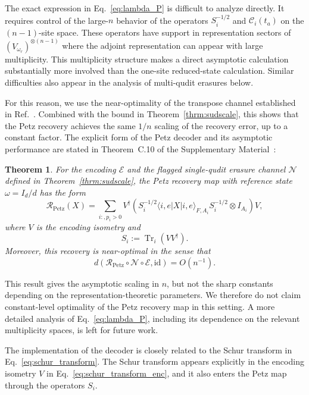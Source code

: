\documentclass[10pt,twocolumn,superscriptaddress,aps,amsmath,amssymb,citeautoscript,floatfix,prx]{revtex4-2}
\newtheorem{theorem}{Theorem}
\theoremstyle{plain}
\theoremstyle{plain}
\theoremstyle{plain}
\theoremstyle{plain}
\theoremstyle{plain}
\theoremstyle{plain}
\begin{document}
The exact expression in Eq.~\eqref{eq:lambda_P} is difficult to analyze directly. It requires control of the large-$n$ behavior of the operators $S_i^{-1/2}$ and $\mathcal C_i(t_a)$ on the $(n-1)$-site space. These operators have support in representation sectors of $(V_{\omega_r})^{\otimes(n-1)}$ where the adjoint representation can appear with large multiplicity. This multiplicity structure makes a direct asymptotic calculation substantially more involved than the one-site reduced-state calculation. Similar difficulties also appear in the analysis of multi-qudit erasures below.

For this reason, we use the near-optimality of the transpose channel established in Ref.~\cite{Ng2010}. Combined with the bound in Theorem~\ref{thrm:sudscale}, this shows that the Petz recovery achieves the same $1/n$ scaling of the recovery error, up to a constant factor. The explicit form of the Petz decoder and its asymptotic performance are stated in Theorem~C.10 of the Supplementary Material~\cite{SuppMat}:

\begin{theorem}
For the encoding $\mathcal E$ and the flagged single-qudit erasure channel $\mathcal N$ defined in Theorem~\ref{thrm:sudscale}, the Petz recovery map with reference state $\omega=I_d/d$ has the form
$$
\mathcal R_{\mathrm{Petz}}(X)
=
\sum_{i:,p_i>0}
V^\dagger
\left(
S_i^{-1/2}
\langle i,e|X|i,e\rangle_{F,A_i}
S_i^{-1/2}
\otimes I_{A_i}
\right)
V,
$$
where $V$ is the encoding isometry and
$$
S_i
:=
\operatorname{Tr}_i\left(VV^\dagger\right).
$$
Moreover, this recovery is near-optimal in the sense that
$$
    d\left(
    \mathcal R_{\mathrm{Petz}}
    \circ
    \mathcal N
    \circ
    \mathcal E,
    \mathrm{id}
    \right)
    =
    O(n^{-1}) .
$$
\end{theorem}

This result gives the asymptotic scaling in $n$, but not the sharp constants depending on the representation-theoretic parameters. We therefore do not claim constant-level optimality of the Petz recovery map in this setting. A more detailed analysis of Eq.~\eqref{eq:lambda_P}, including its dependence on the relevant multiplicity spaces, is left for future work.

The implementation of the decoder is closely related to the Schur transform in Eq.~\eqref{eq:schur_transform}. The Schur transform appears explicitly in the encoding isometry $V$ in Eq.~\eqref{eq:schur_transform_enc}, and it also enters the Petz map through the operators $S_i$.
\end{document}
